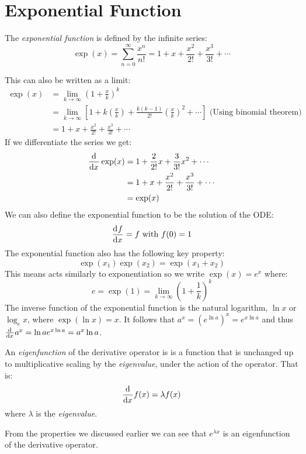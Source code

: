 \documentclass[../main.tex]{subfiles}
\begin{document}
\section{Exponential Function}
\begin{definition}
  The \textit{exponential function} is defined by the infinite series:
  \[
    \exp(x) = \sum_{n=0}^{\infty} \frac{x^{n}}{n!} = 1 + x + \frac{x^2}{2!} + \frac{x^3}{3!} + \cdots
  \]
\end{definition}
This can also be written as a limit:
\begin{align*}
  \exp(x) &= \lim_{k \to \infty} \left(1 + \frac{x}{k}\right)^{k} \\
          &= \lim_{k \to \infty} \left[1 + k\left(\frac{x}{k}\right) + \frac{k(k-1)}{2!}\left(\frac{x}{k}\right)^2 + \cdots\right] \text{ (Using binomial theorem)}\\
          &= 1 + x + \frac{x^2}{2!} + \frac{x^3}{3!} + \cdots
\end{align*}
If we differentiate the series we get:
\begin{align*}
  \deriv{}{x}\exp(x) &= 1 + \frac{2}{2!} x + \frac{3}{3!} x^2 + \cdots \\
                     &= 1 + x + \frac{x^2}{2!} + \frac{x^3}{3!} + \cdots \\
                     &= \exp(x)
\end{align*}
We can also define the exponential function to be the solution of the ODE:
\[
  \deriv{f}{x} = f \text{ with }f(0) = 1
\]
The exponential function also has the following key property:
\[
  \exp(x_1)\exp(x_2) = \exp(x_1 + x_2)
\]
This means acts similarly to exponentiation so we write $\exp(x) = e^{x}$ where:
\[
  e = \exp(1) = \lim_{k \to \infty} \left(1 + \frac{1}{k}\right)^{k}
\]
The inverse function of the exponential function is the natural logarithm, $\ln x$ or $\log_{e} x$, where $\exp(\ln x) = x$.
It follows that $a^{x} = (e^{\ln a})^{x} = e^{x \ln a}$ and thus $\deriv{}{x}a^{x} = \ln a e^{x \ln a} = a^{x} \ln a$.
\begin{definition}[Eigenfunction]
  An \textit{eigenfunction} of the derivative operator is is a function that is unchanged up to multiplicative scaling by the \textit{eigenvalue}, under the action of the operator.
  That is:
  \[
    \deriv{}{x}f(x) = \lambda f(x)
  \]
  where $\lambda$ is the \textit{eigenvalue}.
\end{definition}
From the properties we discussed earlier we can see that $e^{\lambda x}$ is an eigenfunction of the derivative operator.
\end{document}
